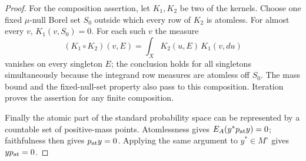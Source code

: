 \begin{proof}
For the composition assertion, let $K_1,K_2$ be two of the kernels.
Choose one fixed $\mu$-null Borel set $S_0$ outside which every row of $K_2$
is atomless.  For almost every $v$, $K_1(v,S_0)=0$.  For each such $v$
the measure
\[
 (K_1\circ K_2)(v,E)=\int_X K_2(u,E)\,K_1(v,du)
\]
vanishes on every singleton $E$; the conclusion holds for all
singletons simultaneously because the integrand row measures are
atomless off $S_0$.  The mass bound and the fixed-null-set property
also pass to this composition.  Iteration proves the assertion for
any finite composition.

Finally the atomic part of the standard probability space can be
represented by a countable set of positive-mass points.  Atomlessness
gives $E_A(y^*p_{\rm at}y)=0$; faithfulness then gives
$p_{\rm at}y=0$.  Applying the same argument to $y^*\in M^\circ$
gives $yp_{\rm at}=0$.
\end{proof}
